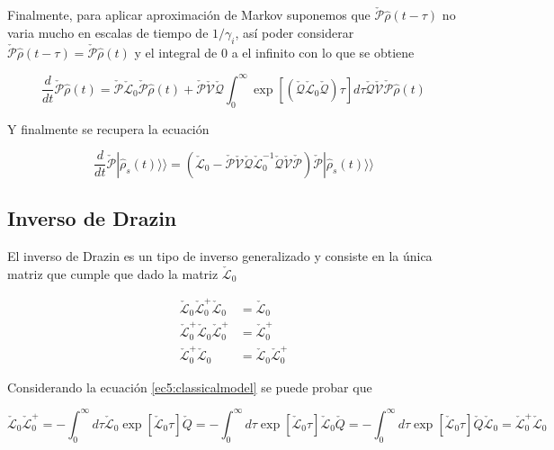 \begin{appendixs}
Finalmente, para aplicar aproximación de Markov suponemos que $\check{\mathcal{P}}\hat{\rho}(t-\tau)$ no varia mucho en escalas de tiempo de $1/\gamma_{i}$, así poder considerar $\check{\mathcal{P}}\hat{\rho}(t-\tau) = \check{\mathcal{P}}\hat{\rho}(t)$ y el integral de $0$ a el infinito con lo que se obtiene

\begin{equation*}
    \frac{d}{dt}\check{\mathcal{P}}\hat{\rho}(t) = \check{\mathcal{P}}\check{\mathcal{L}}_{0}\check{\mathcal{P}}\hat{\rho}(t) + \check{\mathcal{P}}\check{\mathcal{V}}\check{\mathcal{Q}}\int_{0}^{\infty}\exp \left[\left( \check{\mathcal{Q}}\check{\mathcal{L}}_{0}\check{\mathcal{Q}}\right)\tau \right]d\tau \check{\mathcal{Q}}\check{\mathcal{V}} \check{\mathcal{P}}\hat{\rho}(t)        
\end{equation*}

Y finalmente se recupera la ecuación 

\begin{equation*}
    \frac{d}{dt}\check{\mathcal{P}}|\hat{\rho}_{s}(t)\rangle \rangle = (\check{\mathcal{L}}_{0} - \check{\mathcal{P}}\check{\mathcal{V}}\check{\mathcal{Q}}\check{\mathcal{L}}^{-1}_{0}\check{\mathcal{Q}}\check{\mathcal{V}}\check{\mathcal{P}})\check{\mathcal{P}}|\hat{\rho}_{s}(t)\rangle \rangle 
\end{equation*}

\label{appendix5clasic}

\subsection{ Inverso de Drazin }
El inverso de Drazin es un tipo de inverso generalizado y consiste en la única matriz que cumple que dado la matriz $\check{\mathcal{L}}_{0}$

\begin{align*}
    \check{\mathcal{L}}_{0}\check{\mathcal{L}}_{0}^{+}\check{\mathcal{L}}_{0} & = \check{\mathcal{L}}_{0} \\
    \check{\mathcal{L}}_{0}^{+}\check{\mathcal{L}}_{0}\check{\mathcal{L}}_{0}^{+} & = \check{\mathcal{L}}_{0}^{+} \\
    \check{\mathcal{L}}_{0}^{+}\check{\mathcal{L}}_{0} & = \check{\mathcal{L}}_{0}\check{\mathcal{L}}_{0}^{+}
\end{align*}

Considerando la ecuación \ref{ec5:classicalmodel} se puede probar que 

\begin{equation*}
    \check{\mathcal{L}}_{0}\check{\mathcal{L}}_{0}^{+} = - \int_{0}^{\infty}d\tau \check{\mathcal{L}}_{0}\exp[ \check{\mathcal{L}}_{0}\tau] \check{Q}= - \int_{0}^{\infty}d\tau \exp[ \check{\mathcal{L}}_{0}\tau]\check{\mathcal{L}}_{0} \check{Q} = - \int_{0}^{\infty}d\tau \exp[ \check{\mathcal{L}}_{0}\tau] \check{Q} \check{\mathcal{L}}_{0} = \check{\mathcal{L}}_{0}^{+}\check{\mathcal{L}}_{0}
\end{equation*}


\end{appendixs}
